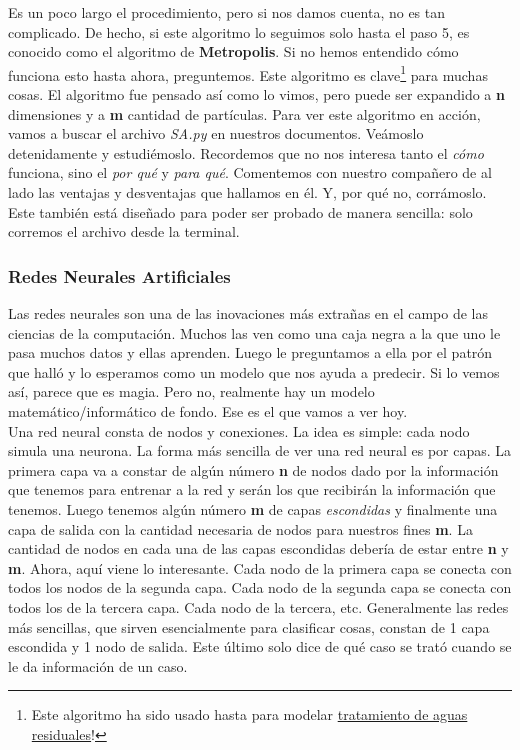\documentclass[10pt,letterpaper]{article}
\begin{document}
Es un poco largo el procedimiento, pero si nos damos cuenta, no es tan complicado. De hecho, si este algoritmo lo seguimos solo hasta el paso 5, es conocido como el algoritmo de \textbf{Metropolis}. Si no hemos entendido c\'omo funciona esto hasta ahora, preguntemos. Este algoritmo es clave\footnote{Este algoritmo ha sido usado hasta para modelar \href{http://www.sciencedirect.com/science/article/pii/S0043135415301160}{tratamiento de aguas residuales}!} para muchas cosas. El algoritmo fue pensado as\'i como lo vimos, pero puede ser expandido a \textbf{n} dimensiones y a \textbf{m} cantidad de part\'iculas. Para ver este algoritmo en acci\'on, vamos a buscar el archivo \textit{SA.py} en nuestros documentos. Ve\'amoslo detenidamente y estudi\'emoslo. Recordemos que no nos interesa tanto el \emph{c\'omo} funciona, sino el \emph{por qu\'e} y \emph{para qu\'e}. Comentemos con nuestro compa\~nero de al lado las ventajas y desventajas que hallamos en \'el. Y, por qu\'e no, corr\'amoslo. Este tambi\'en est\'a dise\~nado para poder ser probado de manera sencilla: solo corremos el archivo desde la terminal.

\subsubsection{Redes Neurales Artificiales}
Las redes neurales son una de las inovaciones m\'as extra\~nas en el campo de las ciencias de la computaci\'on. Muchos las ven como una caja negra a la que uno le pasa muchos datos y ellas aprenden. Luego le preguntamos a ella por el patr\'on que hall\'o y lo esperamos como un modelo que nos ayuda a predecir. Si lo vemos as\'i, parece que es magia. Pero no, realmente hay un modelo matem\'atico/inform\'atico de fondo. Ese es el que vamos a ver hoy.\\

Una red neural consta de nodos y conexiones. La idea es simple: cada nodo simula una neurona. La forma m\'as sencilla de ver una red neural es por capas. La primera capa va a constar de alg\'un n\'umero \textbf{n} de nodos dado por la informaci\'on que tenemos para entrenar a la red y ser\'an los que recibir\'an la informaci\'on que tenemos. Luego tenemos alg\'un n\'umero \textbf{m} de capas \emph{escondidas} y finalmente una capa de salida con la cantidad necesaria de nodos para nuestros fines \textbf{m}. La cantidad de nodos en cada una de las capas escondidas deber\'ia de estar entre \textbf{n} y \textbf{m}. Ahora, aqu\'i viene lo interesante. Cada nodo de la primera capa se conecta con todos los nodos de la segunda capa. Cada nodo de la segunda capa se conecta con todos los de la tercera capa. Cada nodo de la tercera, etc. Generalmente las redes m\'as sencillas, que sirven esencialmente para clasificar cosas, constan de 1 capa escondida y 1 nodo de salida. Este \'ultimo solo dice de qu\'e caso se trat\'o cuando se le da informaci\'on de un caso.\\
\end{document}
